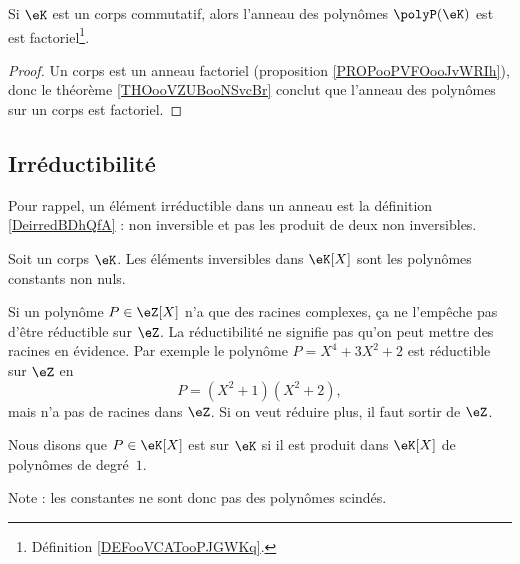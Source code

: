 \begin{proposition}     \label{PropqGZXvr}
	Si \( \eK\) est un corps commutatif, alors l'anneau des polynômes \( \polyP(\eK)\) est est factoriel\footnote{Définition \ref{DEFooVCATooPJGWKq}.}.
\end{proposition}

\begin{proof}
	Un corps est un anneau factoriel (proposition \ref{PROPooPVFOooJvWRIh}), donc le théorème \ref{THOooVZUBooNSvcBr} conclut que l'anneau des polynômes sur un corps est factoriel.
\end{proof}

\subsection{Irréductibilité}

Pour rappel, un élément irréductible dans un anneau est la définition \ref{DeirredBDhQfA} : non inversible et pas les produit de deux non inversibles.

\begin{lemma}       \label{LEMooTMSUooCWoVHG}
	Soit un corps \( \eK\). Les éléments inversibles dans \( \eK[X]\) sont les polynômes constants non nuls.
\end{lemma}

\begin{example}
	Si un polynôme \( P\in \eZ[X]\) n'a que des racines complexes, ça ne l'empêche pas d'être réductible sur \( \eZ\). La réductibilité ne signifie pas qu'on peut mettre des racines en évidence. Par exemple le polynôme \( P=X^4+3X^2+2\) est réductible sur \( \eZ\) en
	\begin{equation}
		P=(X^2+1)(X^2+2),
	\end{equation}
	mais n'a pas de racines dans \( \eZ\). Si on veut réduire plus, il faut sortir de \( \eZ\).

\end{example}

\begin{definition}  \label{DefCPLSooQaHJKQ}
	Nous disons que \( P\in\eK[X]\) est  sur \(\eK\) si il est produit dans \(\eK[X]\) de polynômes de degré~\( 1\).
\end{definition}
Note : les constantes ne sont donc pas des polynômes scindés.

